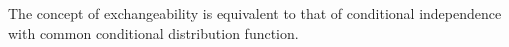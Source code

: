 The concept of exchangeability is equivalent to that of conditional independence with common conditional distribution function.
